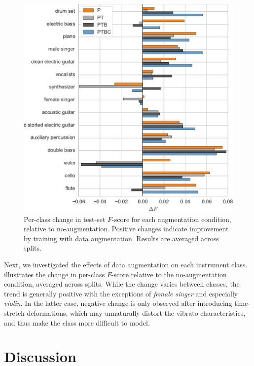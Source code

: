 \documentclass{article}
\begin{document}


\begin{figure}
    \centering
    \includegraphics[width=\columnwidth]{figs/fscore-improvement}
    \caption{Per-class change in test-set $F$-score for each augmentation condition,
        relative to no-augmentation.  
        Positive changes indicate improvement by training with data augmentation.
        Results are averaged across splits.\label{fscore}}
\end{figure}

Next, we investigated the effects of data augmentation on each instrument class.
 illustrates the change in per-class $F$-score relative to the
no-augmentation condition, averaged across splits.
While the change varies between classes, the trend is generally positive
with the exceptions of \emph{female singer} and especially \emph{violin}.
In the latter case, negative change is only observed after introducing time-stretch
deformations, which may unnaturally distort the vibrato characteristics,
and thus make the class more difficult to model.

\section{Discussion}



\end{document}
